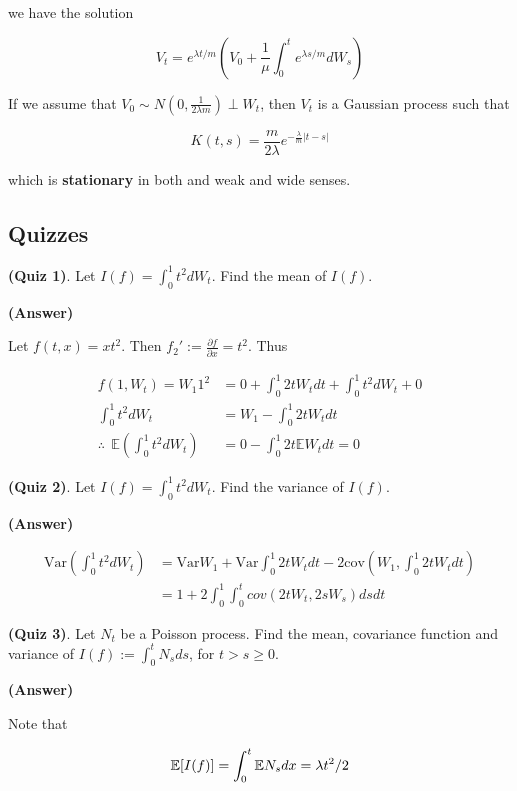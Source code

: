\documentclass[12pt]{article}
\theoremstyle{nonumberbreak}
\begin{document}
we have the solution 

$$
V_t = e^{\lambda t/m} \left( V_0 + \frac{1}{\mu} \int_0^t e^{\lambda s/m} dW_s \right)
$$

If we assume that $V_0 \sim N \left( 0, \frac{1}{2\lambda m} \right) \perp W_t$, then $V_t$ is a Gaussian process such that

$$
K(t,s) = \frac{m}{2\lambda} e^{-\frac{\lambda}{m} |t-s| }
$$

which is \textbf{stationary} in both and weak and wide senses.



\subsection*{Quizzes}


\textbf{(Quiz 1)}. Let $I(f) = \int_0^1 t^2 dW_t$. Find the mean of $I(f)$. 

\textbf{(Answer)}

Let $f(t,x) = xt^2$. Then $f_2' := \frac{\partial f}{\partial x} = t^2$. Thus 

$$
\begin{aligned}
f(1,W_t) = W_1 1^2 &= 0 + \int_0^1 2t W_t dt + \int_0^1 t^2 dW_t + 0  \\[8pt]
\int_0^1 t^2 dW_t &= W_1 - \int_0^1 2t W_t dt \\[8pt]
\therefore \ \ \mathbb{E} \left( \int_0^1 t^2 dW_t \right) &= 0 - \int_0^1 2t\mathbb{E}W_t dt = 0
\end{aligned}
$$



\textbf{(Quiz 2)}. Let $I(f) = \int_0^1 t^2 dW_t$. Find the variance of $I(f)$. 

\textbf{(Answer)} 

$$
\begin{aligned}
\mathrm{Var} \left( \int_0^1 t^2 dW_t \right) &= \mathrm{Var} W_1 + \mathrm{Var} \int_0^1 2t W_t dt - 2\mathrm{cov} \left( W_1, \int_0^1 2t W_t dt \right) \\[8pt]
&= 1 + 2 \int_0^1 \int_0^t cov(2tW_t, 2sW_s) ds dt 
\end{aligned}
$$


\textbf{(Quiz 3)}. Let $N_t$ be a Poisson process. Find the mean, covariance function and variance of $I(f) := \int_0^t N_s ds$, for $t > s \ge 0$. 

\textbf{(Answer)} 

Note that 

$$
\mathbb{E}[I(f)] = \int_0^t \mathbb{E}N_s dx = \lambda t^2 /2 \\[8pt]
$$
\end{document}
